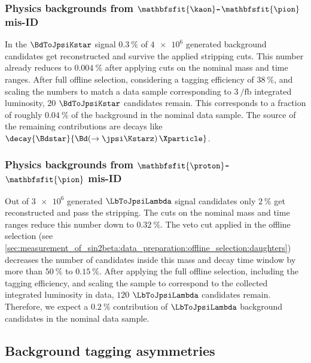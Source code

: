 \subsubsection{Physics backgrounds from $\mathbfsfit{\kaon}$-$\mathbfsfit{\pion}$ mis-ID}
\label{sec:measurement_of_sin2beta:physic_backgrounds:physic_backgrounds:kstar}

In the $\BdToJpsiKstar$ signal \MC $\SI{0.3}{\percent}$ of $\num{4e6}$ generated
background candidates get reconstructed and survive the applied stripping cuts.
This number already reduces to $\SI{0.004}{\percent}$ after applying cuts on the
nominal mass and time ranges. After full offline selection, considering a
tagging efficiency of $\SI{38}{\percent}$, and scaling the numbers to match a
data sample corresponding to
$\SI[separate-uncertainty=true]{3}{\per\femto\barn}$ integrated luminosity,
$\num{20}$ $\BdToJpsiKstar$ candidates remain. This corresponds to a fraction of
roughly $\SI{0.04}{\percent}$ of the background in the nominal data sample. The
source of the remaining contributions are \eg decays like
$\decay{\Bdstar}{\Bd(\to\jpsi\Kstarz)\,\Xparticle}$.

\subsubsection{Physics backgrounds from $\mathbfsfit{\proton}$-$\mathbfsfit{\pion}$ mis-ID}
\label{sec:measurement_of_sin2beta:physic_backgrounds:physic_backgrounds:lambda}

Out of $\num{3e6}$ generated $\LbToJpsiLambda$ signal candidates only
$\SI{2}{\percent}$ get reconstructed and pass the stripping. The cuts on the
nominal mass and time ranges reduce this number down to $\SI{0.32}{\percent}$.
The veto cut applied in the offline selection (see
\cref{sec:measurement_of_sin2beta:data_preparation:offline_selection:daughters})
decreases the number of candidates inside this mass and decay time window by
more than $\SI{50}{\percent}$ to $\SI{0.15}{\percent}$. After applying the full
offline selection, including the tagging efficiency, and scaling the sample to
correspond to the collected integrated luminosity in data, $\num{120}$
$\LbToJpsiLambda$ candidates remain. Therefore, we expect a $\SI{0.2}{\percent}$
contribution of $\LbToJpsiLambda$ background candidates in the nominal data
sample.

\subsection{Background tagging asymmetries}
\label{sec:measurement_of_sin2beta:physic_backgrounds:tagging_asymmetries}

